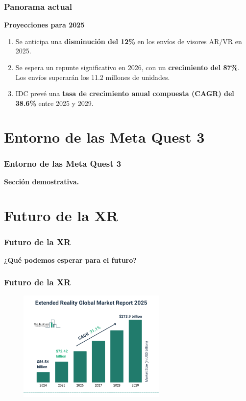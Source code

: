 \documentclass[aspectratio=169,17pt]{beamer}
\begin{document}
    \begin{frame}
        \frametitle{Panorama actual}
            \textbf{Proyecciones para 2025}\\
            \begin{enumerate}
                \item Se anticipa una \textbf{disminución del 12\%} en los envíos de visores AR/VR en 2025.
                \item Se espera un repunte significativo en 2026, con un \textbf{crecimiento del 87\%}. Los envíos superarán los 11.2 millones de unidades.
                \item IDC prevé una \textbf{tasa de crecimiento anual compuesta (CAGR) del 38.6\%} entre 2025 y 2029.
            \end{enumerate}
    \end{frame}    

\section{Entorno de las Meta Quest 3}
    \begin{frame}
        \frametitle{Entorno de las Meta Quest 3}
            \centering
            \textbf{Sección demostrativa.}
    \end{frame}

\section{Futuro de la XR}
    \begin{frame}
        \frametitle{Futuro de la XR}
            \centering
            \textbf{¿Qué podemos esperar para el futuro?}
    \end{frame}

    \begin{frame}
        \frametitle{Futuro de la XR}
            \begin{figure}
                \centering
                \includegraphics[width=0.65\textwidth]{Gráfica 3.png}
                \label{Gra3}
            \end{figure}
    \end{frame}
\end{document}

